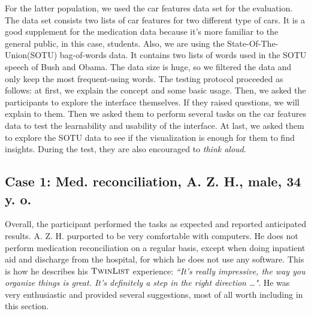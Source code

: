 \documentclass{chi2009}
\newcommand{\TwinList}{\textsc{TwinList}}
\begin{document}
For the latter population, we used the car features data set for the evaluation. The data set consists two lists of car features for two different type of cars. It is a good supplement for the medication data because it's more familiar to the general public, in this case, students. Also, we are using the State-Of-The-Union(SOTU) bag-of-words data. It contains two lists of words used in the SOTU speech of Bush and Obama. The data size is huge, so we filtered the data and only keep the most frequent-using words. The testing protocol proceeded as follows: at first, we explain the concept and some basic usage. Then, we asked the participants to explore the interface themselves. If they raised questions, we will explain to them. Then we asked them to perform several tasks on the car features data to test the learnability and usability of the interface. At last, we asked them to explore the SOTU data to see if the visualization is enough for them to find insights. During the test, they are also encouraged to \textit{think aloud}.

\subsection{Case 1: Med. reconciliation, A. Z. H., male, 34 y. o.}
Overall, the participant performed the tasks as expected and reported anticipated results. A. Z. H. purported to be very comfortable with computers. He does not perform medication reconciliation on a regular basis, except when doing inpatient aid and discharge from the hospital, for which he does not use any software. This is how he describes his $\TwinList$ experience: \textit{``It's really impressive, the way you organize things is great. It's definitely a step in the right direction \dots"}. He was very enthusiastic and provided several suggestions, most of all worth including in this section. 
\end{document}
